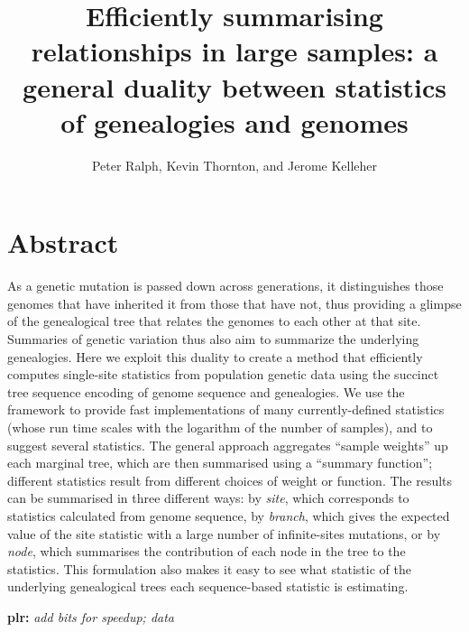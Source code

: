 \documentclass{article}
\newcommand{\plr}[1]{{\color{blue}\textbf{plr:} \it #1}}
\begin{document}
\title{
    Efficiently summarising relationships in large samples:
    a general duality between statistics of genealogies and genomes}
\author{Peter Ralph, Kevin Thornton, and Jerome Kelleher}
\maketitle



\section*{Abstract}

As a genetic mutation is passed down across generations,
it distinguishes those genomes that have inherited it from those that have not,
thus providing a glimpse of the genealogical tree that relates the genomes to each other at that site.
Summaries of genetic variation thus also aim to summarize the underlying genealogies.
Here we exploit this duality to create a method that efficiently computes single-site statistics
from population genetic data using the succinct tree sequence encoding
of genome sequence and genealogies.
We use the framework to provide fast implementations of many currently-defined statistics
(whose run time scales with the logarithm of the number of samples),
and to suggest several statistics.
The general approach aggregates ``sample weights'' up each marginal tree,
which are then summarised using a ``summary function'';
different statistics result from different choices of weight or function.
The results can be summarised in three different ways:
by \emph{site}, which corresponds to statistics calculated from genome sequence,
by \emph{branch}, which gives the expected value of the site statistic
with a large number of infinite-sites mutations,
or by \emph{node}, which summarises the contribution of each node in the tree to the statistics.
This formulation also makes it easy to see what statistic of the underlying genealogical trees
each sequence-based statistic is estimating.

\plr{add bits for speedup; data}
\end{document}
